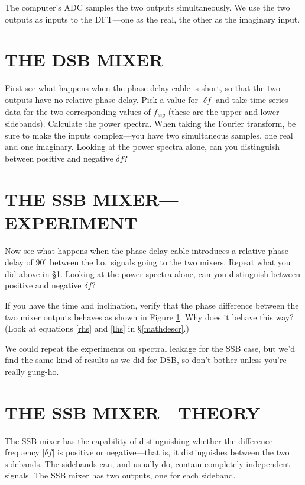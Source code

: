 \documentclass[11pt,preprint]{aastex}
\begin{document}
The computer's ADC samples the two outputs simultaneously. We use the
two outputs as inputs to the DFT---one as the real, the other as the
imaginary input.

\section{THE DSB MIXER} \label{dsbmixer}

First see what happens when the phase delay cable is short, so that the two
outputs have no relative phase delay. Pick a value for $|\delta f|$ and
take time series data for the two corresponding values of $f_{sig}$ (these
are the upper and lower sidebands). Calculate the power spectra. When
taking the Fourier transform, be sure to make the inputs complex---you have
two simultaneous samples, one real and one imaginary. Looking at the power
spectra alone, can you distinguish between positive and negative $\delta
f$?


\section{THE SSB MIXER---EXPERIMENT}

Now see what happens when the phase delay cable introduces a relative phase
delay of $90^\circ$ between the l.o.\ signals going to the two mixers.
Repeat what you did above in \S \ref{dsbmixer}. Looking at the power
spectra alone, can you distinguish between positive and negative $\delta
f$?

If you have the time and inclination, verify that the phase difference
between the two mixer outputs behaves as shown in Figure \ref{dsbmixer}.
Why does it behave this way?  (Look at equations \ref{rhs} and \ref{lhs} in
\S \ref{mathdescr}.)

We could repeat the experiments on spectral leakage for the SSB case, but
we'd find the same kind of results as we did for DSB, so don't bother
unless you're really gung-ho.

\section{THE SSB MIXER---THEORY}

The SSB mixer has the capability of distinguishing whether the
difference frequency $|\delta f|$ is positive or negative---that
is, it distinguishes between the two sidebands.  The sidebands can, and
usually do, contain completely independent signals. The SSB mixer has
two outputs, one for each sideband.
\end{document}
